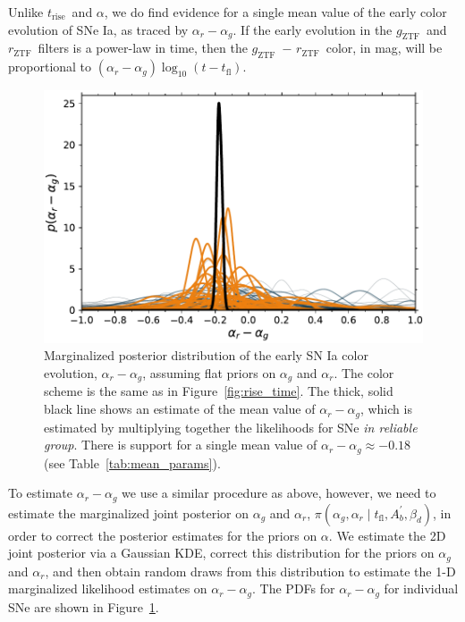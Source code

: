 \documentclass[twocolumn]{./aastex63}
\newcommand{\rztf}{$r_\mathrm{ZTF}$}
\newcommand{\gztf}{$g_\mathrm{ZTF}$}
\newcommand{\trise}{$t_\mathrm{rise}$}
\begin{document}
Unlike \trise\ and $\alpha$, we do find evidence for a single mean value of
the early color evolution of SNe Ia, as traced by $\alpha_r - \alpha_g$. If
the early evolution in the \gztf\ and \rztf\ filters is a power-law in time,
then the \gztf\ $-$ \rztf\ color, in mag, will be proportional to $(\alpha_r -
\alpha_g) \log_{10} (t - t_\mathrm{fl})$.

\begin{figure}
    \centering
    \includegraphics[width=1\linewidth]{./figures/delta.pdf}
    \caption{Marginalized posterior distribution of the early SN Ia color
    evolution, $\alpha_r - \alpha_g$, assuming flat priors on $\alpha_g$ and
    $\alpha_r$. The color scheme is the same as in Figure~\ref{fig:rise_time}.
    The thick, solid black line shows an estimate of the mean value of
    $\alpha_r - \alpha_g$, which is estimated by multiplying together the
    likelihoods for SNe \textit{in reliable group}. There is support for a
    single mean value of $\alpha_r - \alpha_g \approx -0.18$ (see
    Table~\ref{tab:mean_params}).}
    \label{fig:delta}
\end{figure}

To estimate $\alpha_r - \alpha_g$ we use a similar procedure as above,
however, we need to estimate the marginalized joint posterior on $\alpha_g$
and $\alpha_r$, $\pi(\alpha_g,\alpha_r \mid t_\mathrm{fl}, A^\prime_b,
\beta_d)$, in order to correct the posterior estimates for the priors on
$\alpha$. We estimate the 2D joint posterior via a Gaussian KDE, correct this
distribution for the priors on $\alpha_g$ and $\alpha_r$, and then obtain
random draws from this distribution to estimate the 1-D marginalized
likelihood estimates on $\alpha_r - \alpha_g$. The PDFs for $\alpha_r -
\alpha_g$ for individual SNe are shown in Figure~\ref{fig:delta}.
\end{document}
